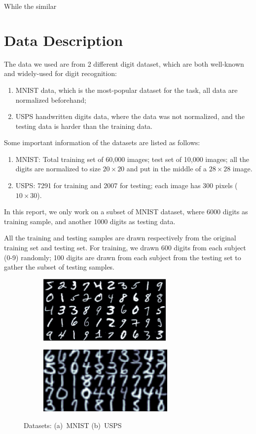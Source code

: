 \documentclass[12pt]{article}
\begin{document}
While the similar 


\section{Data Description}
\label{sec:data}
The data we used are from 2 different digit dataset, which are both well-known and widely-used for digit recognition:\begin{enumerate}
\item MNIST data\cite{lecun1998gradient}, which is the most-popular dataset for the task, all data are normalized beforehand;
\item USPS handwritten digits data\cite{hull1994database}, where the data was not normalized, and the testing data is harder than the training data.
\end{enumerate}

Some important information of the datasets are listed as follows:
\begin{enumerate}
\item MNIST: Total training set of 60,000 images; test set of 10,000 images; all the digits are normalized to size $20 \times 20$ and put in the middle of a $28 \times 28$ image.
\item USPS: 7291 for training and 2007 for testing; each image has 300 pixels ($10 \times 30$).
\end{enumerate}

In this report, we only work on a subset of MNIST dataset, where 6000 digits as training sample, and another 1000 digits as testing data.

All the training and testing samples are drawn respectively from the original training set and testing set. For training, we drawn 600 digits from each subject (0-9) randomly; 100 digits are drawn from each subject from the testing set to gather the subset of testing samples.

\begin{figure}[tbp]
	\centering
	\begin{subfigure}{.45\textwidth}
		\includegraphics[height = 1.3in]{MNIST}		
		\caption{ }
	\end{subfigure}
	\begin{subfigure}{.45\textwidth}
		\includegraphics[height = 1.3in]{USPS}		
		\caption{ }
	\end{subfigure}
	\caption{Datasets: (a)~MNIST (b)~USPS}
\end{figure}
\end{document}
